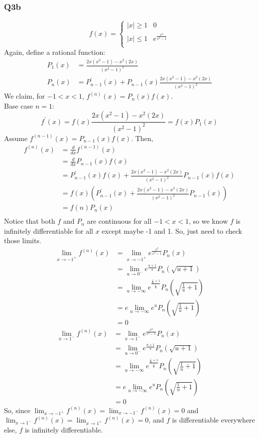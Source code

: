 \documentclass{article}
\begin{document}
\subsubsection*{Q3b}
\[f(x) = \begin{cases}
|x| \geq 1 & 0\\ 
|x| \leq 1 &e^{\frac{x^{2}}{x^{2}-1}}\\
\end{cases}
\]
Again, define a rational function:
\begin{align*}
P_{1}(x) &= \frac{2x(x^{2}-1) - x^{2}(2x)}{(x^{2} - 1)^{2}}\\
P_{n}(x) &= P_{n-1}^{\prime}(x) +P_{n-1}(x) \frac{2x(x^{2}-1) - x^{2}(2x)}{(x^{2} - 1)^{2}}
\end{align*}
We claim, for $-1<x<1$, $f^{(n)}(x) = P_{n}(x)f(x)$.\\
Base case $n=1$:
\begin{equation*}
f^{\prime}(x) = f(x)\frac{2x(x^{2}-1) - x^{2}(2x)}{(x^{2} - 1)^{2}} = f(x)P_{1}(x)
\end{equation*}
Assume $f^{(n-1)}(x) = P_{n-1}(x)f(x)$.
Then, 
\begin{align*}
f^{(n)}(x) &= \frac{d}{dx}f^{(n-1)}(x)\\
&=\frac{d}{dx}P_{n-1}(x)f(x)\\
&= P_{n-1}^{\prime}(x)f(x) + \frac{2x(x^{2}-1) - x^{2}(2x)}{(x^{2} - 1)^{2}}P_{n-1}(x) f(x)\\
&=f(x)(P_{n-1}^{\prime}(x)+ \frac{2x(x^{2}-1) - x^{2}(2x)}{(x^{2} - 1)^{2}}P_{n-1}(x))\\
&=f(n)P_{n}(x)\\
\end{align*}
Notice that both $f$ and $P_{n}$ are continuous for all $-1<x<1$, so we know $f$ is infinitely differentiable for all $x$ except maybe -1 and 1. So, just need to check those limits.
\begin{align*}
\lim_{x\rightarrow -1^{+}} f^{(n)}(x) &= \lim_{x\rightarrow -1^{+}} e^{\frac{x^{2}}{x^{2}-1}} P_{n}(x)\\
&=\lim_{u\rightarrow 0^{-}} e^\frac{u+1}{u}P_{n}(\sqrt{u+1})\\
&=\lim_{u\rightarrow -\infty} e^\frac{\frac{1}{u}+1}{\frac{1}{u}}P_{n}(\sqrt{\frac{1}{u}+1})\\
&=e \lim_{u\rightarrow -\infty} e^{u} P_{n}(\sqrt{\frac{1}{u}+1})\\
&= 0 
\end{align*}
\begin{align*}
\lim_{x\rightarrow 1^{-}} f^{(n)}(x) &= \lim_{x\rightarrow 1^{-}} e^{\frac{x^{2}}{x^{2}-1}} P_{n}(x)\\
&=\lim_{u\rightarrow 0^{-}} e^\frac{u+1}{u}P_{n}(\sqrt{u+1})\\
&=\lim_{u\rightarrow -\infty} e^\frac{\frac{1}{u}+1}{\frac{1}{u}}P_{n}(\sqrt{\frac{1}{u}+1})\\
&=e \lim_{u\rightarrow -\infty} e^{u} P_{n}(\sqrt{\frac{1}{u}+1})\\
&= 0 
\end{align*}
So, since $\lim_{x\rightarrow -1^{+}} f^{(n)}(x) = \lim_{x\rightarrow -1^{-}} f^{(n)}(x) = 0$ and $\lim_{x\rightarrow 1^{-}} f^{(n)}(x) = \lim_{x\rightarrow 1^{+}} f^{(n)}(x) = 0$, and $f$ is differentiable everywhere else, $f$ is infinitely differentiable. 
\end{document}
